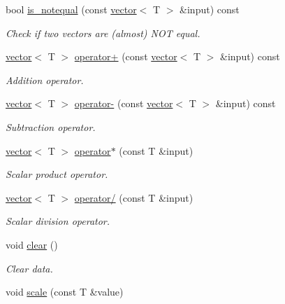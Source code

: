 \begin{DoxyCompactItemize}
bool \hyperlink{classddd_1_1vector_a73bf080395fbbdf9642cf5440d699013}{is\+\_\+notequal} (const \hyperlink{classddd_1_1vector}{vector}$<$ T $>$ \&input) const
\begin{DoxyCompactList}\small\item\em Check if two vectors are (almost) N\+OT equal. \end{DoxyCompactList}\item 
\hyperlink{classddd_1_1vector}{vector}$<$ T $>$ \hyperlink{classddd_1_1vector_a03e9624cbd1f3fa29247c1a67a8678d9}{operator+} (const \hyperlink{classddd_1_1vector}{vector}$<$ T $>$ \&input) const
\begin{DoxyCompactList}\small\item\em Addition operator. \end{DoxyCompactList}\item 
\hyperlink{classddd_1_1vector}{vector}$<$ T $>$ \hyperlink{classddd_1_1vector_aa047958a3d0cf3d3ff3d6ff571920ae0}{operator-\/} (const \hyperlink{classddd_1_1vector}{vector}$<$ T $>$ \&input) const
\begin{DoxyCompactList}\small\item\em Subtraction operator. \end{DoxyCompactList}\item 
\hyperlink{classddd_1_1vector}{vector}$<$ T $>$ \hyperlink{classddd_1_1vector_a9ba05f9c13f8d9cd23f5a5657fcfa948}{operator$\ast$} (const T \&input)
\begin{DoxyCompactList}\small\item\em Scalar product operator. \end{DoxyCompactList}\item 
\hyperlink{classddd_1_1vector}{vector}$<$ T $>$ \hyperlink{classddd_1_1vector_a837824860826c44950c2c48d4bd247e3}{operator/} (const T \&input)
\begin{DoxyCompactList}\small\item\em Scalar division operator. \end{DoxyCompactList}\item 
\mbox{\label{classddd_1_1vector_a5c313955b405726c4c941f621a44b5c6}} 
void \hyperlink{classddd_1_1vector_a5c313955b405726c4c941f621a44b5c6}{clear} ()
\begin{DoxyCompactList}\small\item\em Clear data. \end{DoxyCompactList}\item 
void \hyperlink{classddd_1_1vector_a958883e517d457e63d62be46580db5a0}{scale} (const T \&value)

\end{DoxyCompactItemize}
